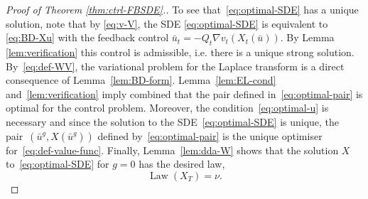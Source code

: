 \documentclass[11pt, a4paper]{scrartcl}
\numberwithin{equation}{section}
\theoremstyle{plain}
\theoremstyle{remark}
\newcommand{\tmop}[1]{\ensuremath{\operatorname{#1}}}
\begin{document}
\begin{proof}[Proof of Theorem \ref{thm:ctrl-FBSDE}.]
	To see that~\eqref{eq:optimal-SDE} has a unique solution, note that by
	\eqref{eq:v-V}, the SDE \eqref{eq:optimal-SDE} is equivalent to
	\eqref{eq:BD-Xu} with the feedback control $\bar{u}_t = - Q_t \nabla v_t
		(X_t (\bar{u}))$. By Lemma \ref{lem:verification} this control is
	admissible, i.e. there is a unique strong solution. By~\eqref{eq:def-WV},
	the variational problem for the Laplace transform is a direct consequence of
	Lemma~\ref{lem:BD-form}. Lemma~\ref{lem:EL-cond} and~\ref{lem:verification}
	imply combined that the pair defined in~\eqref{eq:optimal-pair} is optimal
	for the control problem. Moreover, the condition~\eqref{eq:optimal-u} is
	necessary and since the solution to the SDE~\eqref{eq:optimal-SDE} is
	unique, the pair~$(\bar{u}^g, X (\bar{u}^g))$ defined
	by~\eqref{eq:optimal-pair} is the unique optimiser
	for~\eqref{eq:def-value-func}. Finally, Lemma~\ref{lem:dda-W} shows that the solution $X$ to~\eqref{eq:optimal-SDE}
	for $g = 0$ has the desired law,
	\[ \tmop{Law} (X_T) = \nu . \]
\end{proof}
\end{document}
